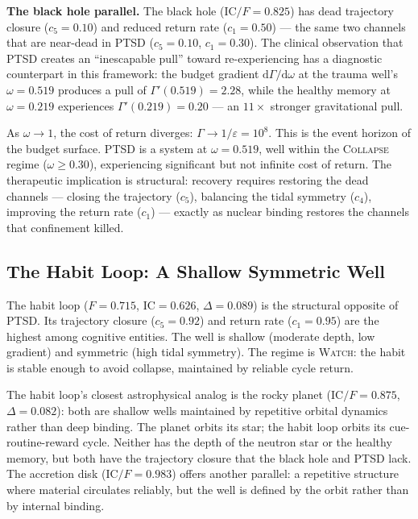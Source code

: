 \documentclass[
  aps,
  prd,
  twocolumn,
  superscriptaddress,
  nofootinbib,
  floatfix
]{revtex4-2}
\newcommand{\Gam}{\Gamma}
\newcommand{\eps}{\varepsilon}
\newcommand{\dd}{\mathrm{d}}
\newcommand{\regime}[1]{\textrm{\upshape\scshape#1}}
\newcommand{\IC}{\mathrm{IC}}
\begin{document}
\textbf{The black hole parallel.}
The black hole ($\IC/F = 0.825$) has dead trajectory closure
($c_5 = 0.10$) and reduced return rate ($c_1 = 0.50$) ---
the same two channels that are near-dead in PTSD ($c_5 = 0.10$,
$c_1 = 0.30$).  The clinical observation that PTSD creates
an ``inescapable pull'' toward re-experiencing has a
diagnostic counterpart in this framework:
the budget gradient $\dd\Gam/\dd\omega$ at the trauma well's
$\omega = 0.519$ produces a pull of $\Gam'(0.519) = 2.28$,
while the healthy memory at $\omega = 0.219$ experiences
$\Gam'(0.219) = 0.20$ --- an $11\times$ stronger gravitational
pull.

As $\omega \to 1$, the cost of return diverges:
$\Gam \to 1/\eps = 10^8$.  This is the event horizon of the
budget surface.  PTSD is a system at $\omega = 0.519$, well
within the \regime{Collapse} regime ($\omega \geq 0.30$),
experiencing significant but not infinite cost of return.
The therapeutic implication is structural: recovery requires
restoring the dead channels --- closing the trajectory
($c_5$), balancing the tidal symmetry ($c_4$), improving
the return rate ($c_1$) --- exactly as nuclear binding
restores the channels that confinement killed.


\subsection{The Habit Loop: A Shallow Symmetric Well}

The habit loop ($F = 0.715$, $\IC = 0.626$,
$\Delta = 0.089$) is the structural opposite of PTSD.
Its trajectory closure ($c_5 = 0.92$) and return rate
($c_1 = 0.95$) are the highest among cognitive entities.
The well is shallow (moderate depth, low gradient) and
symmetric (high tidal symmetry).  The regime is
\regime{Watch}: the habit is stable enough to avoid
collapse, maintained by reliable cycle return.

The habit loop's closest astrophysical analog is the rocky
planet ($\IC/F = 0.875$, $\Delta = 0.082$): both are
shallow wells maintained by repetitive orbital dynamics
rather than deep binding.  The planet orbits its star;
the habit loop orbits its cue-routine-reward cycle.  Neither
has the depth of the neutron star or the healthy memory,
but both have the trajectory closure that the black hole
and PTSD lack.  The accretion disk ($\IC/F = 0.983$)
offers another parallel: a repetitive structure where
material circulates reliably, but the well is defined by
the orbit rather than by internal binding.
\end{document}
